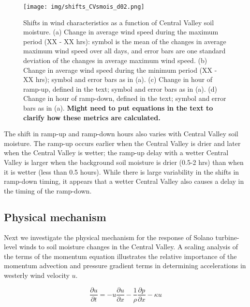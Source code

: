 \begin{figure}[here]
\texttt{[image: img/shifts\_CVsmois\_d02.png]}
\caption{Shifts in wind characteristics as a function of Central Valley soil moisture.  (a) Change in average wind speed during the maximum period (XX - XX hrs): symbol is the mean of the changes in average maximum wind speed over all days, and error bars are one standard deviation of the changes in average maximum wind speed.  (b) Change in average wind speed during the minimum period (XX - XX hrs); symbol and error bars as in (a).  (c) Change in hour of ramp-up, defined in the text; symbol and error bars as in (a).  (d) Change in hour of ramp-down, defined in the text; symbol and error bars as in (a).  \textbf{Might need to put equations in the text to clarify how these metrics are calculated.}}
\label{fig:windSol_WindShiftsCV}
\end{figure}

The shift in ramp-up and ramp-down hours also varies with Central Valley soil moisture.  The ramp-up occurs earlier when the Central Valley is drier and later when the Central Valley is wetter; the ramp-up delay with a wetter Central Valley is larger when the background soil moisture is drier (0.5-2 hrs) than when it is wetter (less than 0.5 hours).  While there is large variability in the shifts in ramp-down timing, it appears that a wetter Central Valley also causes a delay in the timing of the ramp-down.

\subsection{Physical mechanism}
Next we investigate the physical mechanism for the response of Solano turbine-level winds to soil moisture changes in the Central Valley.  A scaling analysis of the terms of the momentum equation illustrates the relative importance of the momentum advection and pressure gradient terms in determining accelerations in westerly wind velocity $u$.  

\begin{equation}
\frac{\partial u}{\partial t} = -u\frac{\partial u}{\partial x} -\frac{1}{\rho} \frac{\partial p}{\partial x} - \kappa u
\end{equation}

